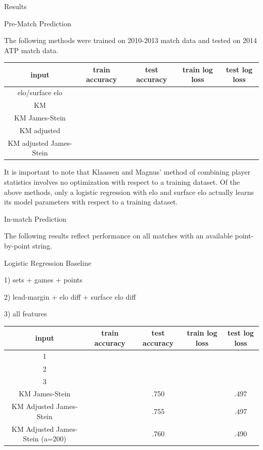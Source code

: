 \documentclass[11pt]{article}
\begin{document}
\newpage
Results

Pre-Match Prediction 

The following methods were trained on 2010-2013 match data and tested on 2014 ATP match data.

\begin{center}
\begin{tabular}{ |c|c|c|c|c| } 
 \hline
 input & train accuracy & test accuracy
& train log loss & test log loss \\ 
 \hline
 elo/surface elo &  &  &  & \\ 
 \hline
 KM &  &  &  & \\ 
 \hline
 KM James-Stein &  &  &  & \\ 
 \hline
 KM adjusted &  &  &  & \\ 
 \hline
 KM adjusted James-Stein &  &  &  & \\ 
 \hline
\end{tabular}
\end{center}

It is important to note that Klaassen and Magnus' method of combining player statistics involves no optimization with respect to a training dataset. Of the above methods, only a logistic regression with elo and surface elo actually learns its model parameters with respect to a training dataset. 


\vskip 3cm
In-match Prediction

The following results reflect performance on all matches with an available point-by-point string.

Logistic Regression Baseline

1) sets + games + points

2) lead-margin + elo diff + surface elo diff

3) all features

\begin{center}
\begin{tabular}{ |c|c|c|c|c| } 
 \hline
 input & train accuracy & test accuracy
& train log loss & test log loss \\ 
 \hline
 1 &  &  &  & \\ 
 \hline
 2 &  &  &  & \\ 
 \hline
 3 &  &  &  & \\ 
 \hline
  KM James-Stein &  & .750 &  & .497 \\ 
 \hline
 KM Adjusted James-Stein &  & .755  &  & .497 \\ 
 \hline
 KM Adjusted James-Stein (a=200) &  & .760 &  & .490 \\ 
 \hline
\end{tabular}
\end{center}

\end{document}
